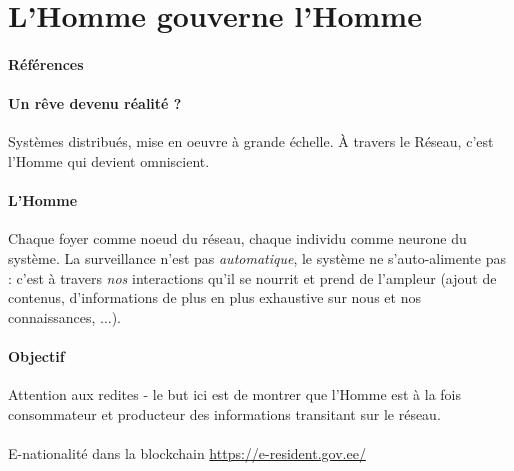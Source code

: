 \section{L'Homme gouverne l'Homme}
\paragraph{Références} \cite{GhostInTheShell}

\paragraph{Un rêve devenu réalité ?} Systèmes distribués, mise en oeuvre à grande échelle.
À travers le Réseau, c'est l'Homme qui devient omniscient.

\paragraph{L'Homme} Chaque foyer comme noeud du réseau, chaque individu comme neurone du
système. La surveillance n'est pas \emph{automatique}, le système ne s'auto-alimente pas :
c'est à travers \emph{nos} interactions qu'il se nourrit et prend de l'ampleur (ajout de 
contenus, d'informations de plus en plus exhaustive sur nous et nos connaissances, ...).

\paragraph{Objectif} Attention aux redites - le but ici est de montrer que l'Homme est à la fois
consommateur et producteur des informations transitant sur le réseau.

\paragraph{} E-nationalité dans la blockchain \url{https://e-resident.gov.ee/}